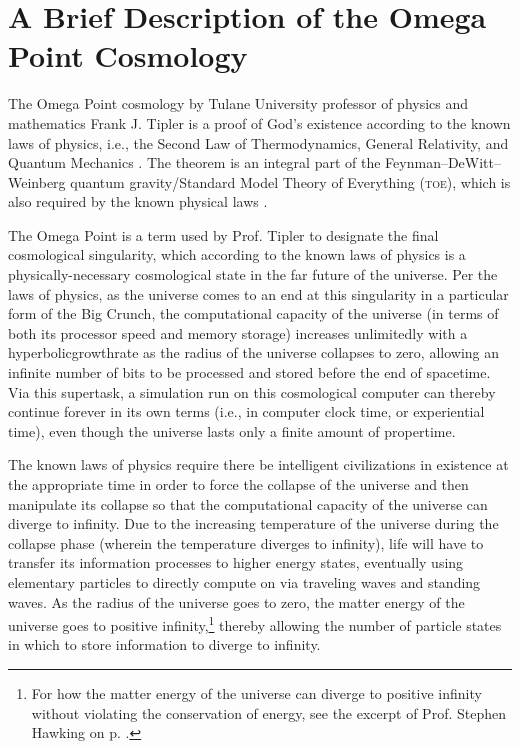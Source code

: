 \documentclass[letterpaper,12pt]{article}
\begin{document}
\newpage

\tableofcontents

\listoffigures

\newpage


\section{A Brief Description of the Omega Point Cosmology}
\label{sec:BriefDescriptionOPC}

The Omega Point cosmology by Tulane University professor of physics and mathematics Frank J. Tipler is a proof of God's existence according to the known laws of physics, i.e., the Second Law of Thermodynamics, General Relativity, and Quantum Mechanics \cite{Tipler1997,Tipler1998,TiplerEtAl2000,Tipler2000b,Tipler2001b,Tipler2003a,Tipler2003b,Tipler2005,Tipler2007}. The theorem is an integral part of the Feynman--DeWitt--Weinberg quantum gravity\slash Standard Model Theory of Everything (\textsc{toe}), which is also required by the known physical laws \cite{Tipler2001b,Tipler2005,Tipler2007}.

The Omega Point is a term used by Prof. Tipler to designate the final cosmological singularity, which according to the known laws of physics is a physically-necessary cosmological state in the far future of the universe. Per the laws of physics, as the universe comes to an end at this singularity in a particular form of the Big Crunch, the computational capacity of the universe (in terms of both its processor speed and memory storage) increases unlimitedly with a \gls{hyperbolicgrowthrate} as the radius of the universe collapses to zero, allowing an infinite number of bits to be processed and stored before the end of spacetime. Via this \gls{supertask}, a simulation run on this cosmological computer can thereby continue forever in its own terms (i.e., in computer clock time, or experiential time), even though the universe lasts only a finite amount of \gls{propertime}.

The known laws of physics require there be intelligent civilizations in existence at the appropriate time in order to force the collapse of the universe and then manipulate its collapse so that the computational capacity of the universe can diverge to infinity. Due to the increasing temperature of the universe during the collapse phase (wherein the temperature diverges to infinity), life will have to transfer its information processes to higher energy states, eventually using elementary particles to directly compute on via traveling waves and standing waves. As the radius of the universe goes to zero, the matter energy of the universe goes to positive infinity,\footnote{For how the matter energy of the universe can diverge to positive infinity without violating the conservation of energy, see the excerpt of Prof. Stephen Hawking on p. \pageref{HawkingEnergy}.} thereby allowing the number of particle states in which to store information to diverge to infinity.
\end{document}
